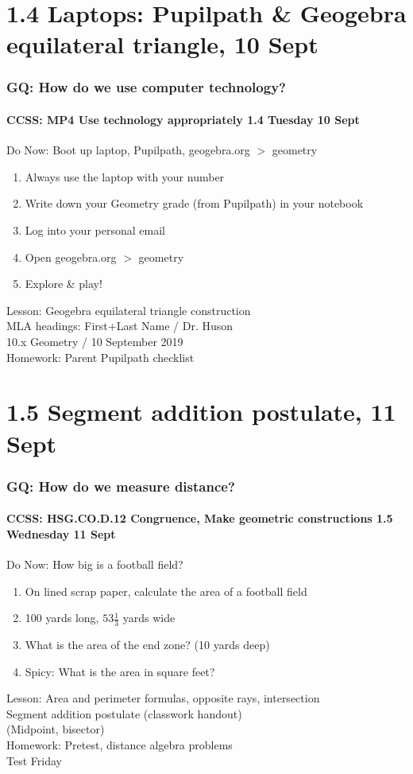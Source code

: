 \documentclass{beamer}
\begin{document}
\section{1.4 Laptops: Pupilpath \& Geogebra equilateral triangle, 10 Sept}
\frame
{
  \frametitle{GQ: How do we use computer technology?}
  \framesubtitle{CCSS: MP4 Use technology appropriately  \hfill \alert{1.4 Tuesday 10 Sept}}

  \begin{block}{Do Now: Boot up laptop, Pupilpath, geogebra.org $>$ geometry}
  \begin{enumerate}
      \item Always use the laptop with your number
      \item Write down your Geometry grade (from Pupilpath) in your notebook
      \item Log into your personal email
      \item Open geogebra.org $>$ geometry
      \item Explore \& play!\\
  \end{enumerate}
  \end{block}
  Lesson: Geogebra equilateral triangle construction\\
  MLA headings: First+Last Name / Dr. Huson \\
  10.x Geometry / 10 September 2019 \\ \vspace{0.25cm}
  Homework: Parent Pupilpath checklist
}

\section{1.5 Segment addition postulate, 11 Sept}
  \frame
  {
    \frametitle{GQ: How do we measure distance?}
    \framesubtitle{CCSS: HSG.CO.D.12 Congruence, Make geometric constructions \hfill \alert{1.5 Wednesday 11 Sept}}

    \begin{block}{Do Now: How big is a football field?}
    \begin{enumerate}
        \item On lined scrap paper, calculate the area of a football field
        \item 100 yards long, $53 \frac{1}{3}$ yards wide
        \item What is the area of the end zone? (10 yards deep)
        \item Spicy: What is the area in square feet?
    \end{enumerate}
    \end{block}
    \vspace{0.5cm}
    Lesson: Area and perimeter formulas, opposite rays, intersection\\
    Segment addition postulate (classwork handout)\\
    (Midpoint, bisector)\\
    \vspace{0.5cm}
    Homework: Pretest, distance algebra problems\\
    \alert{Test Friday}
  }
\end{document}
